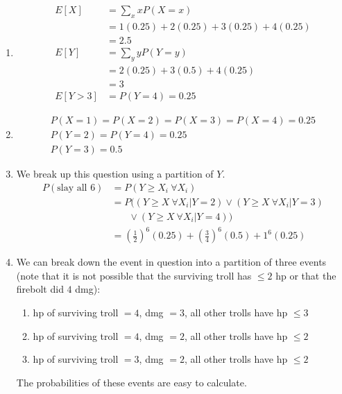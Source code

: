 \documentclass{article}
\begin{document}
\begin{enumerate}
		\begin{enumerate}
			\item
			\begin{align*}
				E[X]&=\sum_{x} xP(X=x)\\
				&=1(0.25)+2(0.25)+3(0.25)+4(0.25)\\
				&=2.5\\
				E[Y]&=\sum_{y}yP(Y=y)\\
				&=2(0.25)+3(0.5)+4(0.25)\\
				&=3\\
				E[Y>3]&=P(Y=4)=0.25
			\end{align*}
			
			\item
			\begin{gather*}
				P(X=1)=P(X=2)=P(X=3)=P(X=4)=0.25\\
				P(Y=2)=P(Y=4)=0.25\\
				P(Y=3)=0.5
			\end{gather*}
			
			\item 
			We break up this question using a partition of $Y$.
			\begin{align*}
				P(\text{slay all 6})&=P(Y\ge X_i\ \forall X_i)\\
				&=P((Y\ge X\ \forall X_i|Y=2)\lor (Y\ge X\ \forall X_i|Y=3)\\
				&\ \ \ \ \ \ \ \ \lor (Y\ge X\ \forall X_i|Y=4))\\
				&=\left(\frac{1}{2}\right)^6(0.25)+\left(\frac{3}{4}\right)^6(0.5)+1^6(0.25)
			\end{align*}
			
			\item
			We can break down the event in question into a partition of three events (note that it is not possible that the surviving troll has $\le 2$ hp or that the firebolt did $4$ dmg):
			\begin{enumerate}
				\item hp of surviving troll $=4$, dmg $=3$, all other trolls have hp $\le 3$
				\item hp of surviving troll $=4$, dmg $=2$, all other trolls have hp $\le 2$
				\item hp of surviving troll $=3$, dmg $=2$, all other trolls have hp $\le 2$
			\end{enumerate}
			The probabilities of these events are easy to calculate.
			

\end{enumerate}
\end{enumerate}
\end{document}
